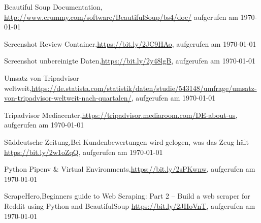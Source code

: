 \documentclass[a4paper,oneside,12pt]{report}
\begin{document}
\begin{thebibliography}{9}
		 Beautiful Soup Documentation, \newline \url{http://www.crummy.com/software/BeautifulSoup/bs4/doc/} aufgerufen am \today
		
		 Screenshot Review Container,\newline \url{https://bit.ly/2JC9HAo}, aufgerufen am \today
		
		 Screenshot unbereinigte Daten,\newline \url{https://bit.ly/2y48lgB}, aufgerufen am \today
		
		 Umsatz von Tripadvisor weltweit,\newline \url{https://de.statista.com/statistik/daten/studie/543148/umfrage/umsatz-von-tripadvisor-weltweit-nach-quartalen/}, aufgerufen am \today
		
		 Tripadvisor Mediacenter,\newline \url{https://tripadvisor.mediaroom.com/DE-about-us}, aufgerufen am \today
		
		 Süddeutsche Zeitung,\newline Bei Kundenbewertungen wird gelogen, was das Zeug hält \newline \url{https://bit.ly/2w1oZqQ}, aufgerufen am \today
		
		 Python Pipenv \& Virtual Environments,\newline \url{https://bit.ly/2sPKwnw}, aufgerufen am \today
		
		 ScrapeHero,\newline Beginners guide to Web Scraping: Part 2 – Build a web scraper for Reddit using Python and BeautifulSoup \newline \url{https://bit.ly/2JHoVnT}, aufgerufen am \today
		
	\end{thebibliography}
	
	
	
	\newpage
\end{document}

